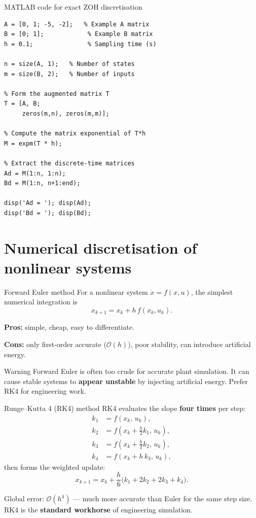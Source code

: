 \documentclass[aspectratio=169,10pt]{beamer}
\begin{document}
\begin{frame}[fragile]{MATLAB code for exact ZOH discretisation}
\begin{lstlisting}[caption={Exact ZOH discretisation using the augmented matrix exponential.}]
% Define a continuous-time LTI system
A = [0, 1; -5, -2];   % Example A matrix
B = [0; 1];            % Example B matrix
h = 0.1;               % Sampling time (s)

n = size(A, 1);   % Number of states
m = size(B, 2);   % Number of inputs

% Form the augmented matrix T
T = [A, B;
     zeros(m,n), zeros(m,m)];

% Compute the matrix exponential of T*h
M = expm(T * h);

% Extract the discrete-time matrices
Ad = M(1:n, 1:n);
Bd = M(1:n, n+1:end);

disp('Ad = '); disp(Ad);
disp('Bd = '); disp(Bd);
\end{lstlisting}
\end{frame}

\section{Numerical discretisation of nonlinear systems}

\begin{frame}{Forward Euler method}
For a nonlinear system $\dot{x}=f(x,u)$, the simplest numerical
integration is
\[
x_{k+1}=x_k + h\,f(x_k,u_k).
\]

\textbf{Pros:} simple, cheap, easy to differentiate.

\textbf{Cons:} only first-order accurate ($\mathcal{O}(h)$), poor
stability, can introduce artificial energy.

\begin{alertbox}{Warning}
Forward Euler is often too crude for accurate plant simulation.
It can cause stable systems to \textbf{appear unstable} by injecting
artificial energy.  Prefer RK4 for engineering work.
\end{alertbox}
\end{frame}

\begin{frame}{Runge--Kutta 4 (RK4) method}
RK4 evaluates the slope \textbf{four times} per step:
\begin{align*}
k_1 &= f(x_k,\,u_k),\\
k_2 &= f\!\left(x_k+\tfrac{h}{2}k_1,\,u_k\right),\\
k_3 &= f\!\left(x_k+\tfrac{h}{2}k_2,\,u_k\right),\\
k_4 &= f(x_k+h\,k_3,\,u_k),
\end{align*}
then forms the weighted update:
\[
\boxed{x_{k+1}=x_k+\frac{h}{6}\big(k_1+2k_2+2k_3+k_4\big)}.
\]

Global error: $\mathcal{O}(h^4)$ --- much more accurate than Euler for the same
step size.  RK4 is the \textbf{standard workhorse} of engineering
simulation.
\end{frame}
\end{document}
